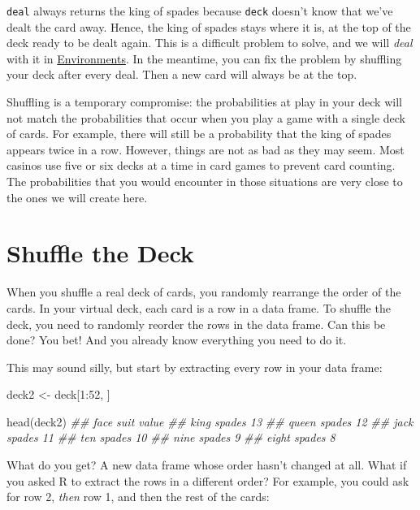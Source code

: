 \documentclass[
  letterpaper,
  DIV=11,
  numbers=noendperiod]{scrbook}
\newenvironment{Shaded}{\begin{snugshade}}{\end{snugshade}}
\newcommand{\DecValTok}[1]{\textcolor[rgb]{0.68,0.00,0.00}{#1}}
\newcommand{\DocumentationTok}[1]{\textcolor[rgb]{0.37,0.37,0.37}{\textit{#1}}}
\newcommand{\FunctionTok}[1]{\textcolor[rgb]{0.28,0.35,0.67}{#1}}
\newcommand{\NormalTok}[1]{\textcolor[rgb]{0.00,0.23,0.31}{#1}}
\newcommand{\OtherTok}[1]{\textcolor[rgb]{0.00,0.23,0.31}{#1}}
\newcommand{\SpecialCharTok}[1]{\textcolor[rgb]{0.37,0.37,0.37}{#1}}
\begin{document}
\texttt{deal} always returns the king of spades because \texttt{deck}
doesn't know that we've dealt the card away. Hence, the king of spades
stays where it is, at the top of the deck ready to be dealt again. This
is a difficult problem to solve, and we will \emph{deal} with it in
\hyperref[sec-environments]{Environments}. In the meantime, you can fix
the problem by shuffling your deck after every deal. Then a new card
will always be at the top.

Shuffling is a temporary compromise: the probabilities at play in your
deck will not match the probabilities that occur when you play a game
with a single deck of cards. For example, there will still be a
probability that the king of spades appears twice in a row. However,
things are not as bad as they may seem. Most casinos use five or six
decks at a time in card games to prevent card counting. The
probabilities that you would encounter in those situations are very
close to the ones we will create here.

\section{Shuffle the Deck}\label{shuffle-the-deck}

When you shuffle a real deck of cards, you randomly rearrange the order
of the cards. In your virtual deck, each card is a row in a data frame.
To shuffle the deck, you need to randomly reorder the rows in the data
frame. Can this be done? You bet! And you already know everything you
need to do it.

This may sound silly, but start by extracting every row in your data
frame:

\begin{Shaded}
\begin{Highlighting}[]
\NormalTok{deck2 }\OtherTok{\textless{}{-}}\NormalTok{ deck[}\DecValTok{1}\SpecialCharTok{:}\DecValTok{52}\NormalTok{, ]}

\FunctionTok{head}\NormalTok{(deck2)}
\DocumentationTok{\#\#   face   suit value}
\DocumentationTok{\#\#   king spades    13}
\DocumentationTok{\#\#  queen spades    12}
\DocumentationTok{\#\#   jack spades    11}
\DocumentationTok{\#\#    ten spades    10}
\DocumentationTok{\#\#   nine spades     9}
\DocumentationTok{\#\#  eight spades     8}
\end{Highlighting}
\end{Shaded}

What do you get? A new data frame whose order hasn't changed at all.
What if you asked R to extract the rows in a different order? For
example, you could ask for row 2, \emph{then} row 1, and then the rest
of the cards:
\end{document}
